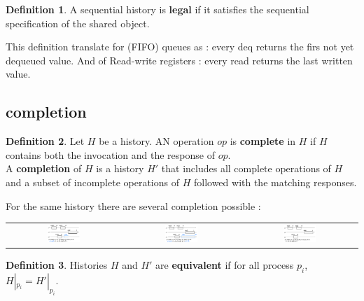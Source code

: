 \documentclass{article}
\theoremstyle{definition}
\newtheorem{definition}{Definition}[section]
\begin{document}
\begin{definition}
A sequential history is \textbf{legal} if it satisfies the sequential specification of the shared object.
\end{definition}

This definition translate for (FIFO) queues as : every deq returns the firs not yet dequeued value. And of Read-write registers : every read returns the last written value.

\subsection{completion}

\begin{definition}
Let $H$ be a history. AN operation $op$ is \textbf{complete} in $H$ if $H$ contains both the invocation and the response of $op$.\\
A \textbf{completion} of $H$ is a history $H'$ that includes all complete operations of $H$ and a subset of incomplete operations of $H$ followed with the matching responses.
\end{definition}

For the same history there are several completion possible :

\begin{center}
\begin{tabular}{c c c}
\includegraphics[width=0.3\textwidth]{complet_1}&
\includegraphics[width=0.3\textwidth]{complet_2}&
\includegraphics[width=0.3\textwidth]{complet_3}
\end{tabular}
\end{center}

\begin{definition}
Histories $H$ and $H'$ are \textbf{equivalent} if for all process $p_i$, $ H|_{p_i} =  H'|_{p_i} $.
\end{definition}
\end{document}
